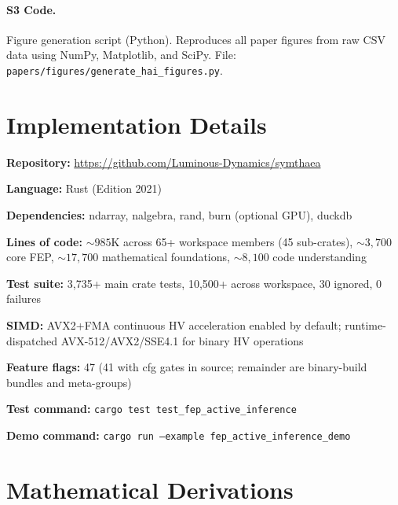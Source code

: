 \documentclass[10pt,letterpaper]{article}
\begin{document}
\paragraph*{S3 Code.}
\label{s3-code}
{Figure generation script (Python). Reproduces all paper figures from raw CSV
data using NumPy, Matplotlib, and SciPy. File:
\texttt{papers/figures/generate\_hai\_figures.py}.}




\appendix

\section{Implementation Details}
\label{app:implementation}

{\raggedright
\textbf{Repository:} \url{https://github.com/Luminous-Dynamics/symthaea}\par
\textbf{Language:} Rust (Edition 2021)\par
\textbf{Dependencies:} ndarray, nalgebra, rand, burn (optional GPU), duckdb\par
\textbf{Lines of code:} ${\sim}985$K across 65+ workspace members (45 sub-crates), ${\sim}3{,}700$ core FEP, ${\sim}17{,}700$ mathematical foundations, ${\sim}8{,}100$ code understanding\par
\textbf{Test suite:} 3,735+ main crate tests, 10,500+ across workspace, 30 ignored, 0 failures\par
\textbf{SIMD:} AVX2+FMA continuous HV acceleration enabled by default; runtime-dispatched AVX-512/AVX2/SSE4.1 for binary HV operations\par
\textbf{Feature flags:} 47 (41 with cfg gates in source; remainder are binary-build bundles and meta-groups)\par
\textbf{Test command:} \texttt{cargo test test\_fep\_active\_inference}\par
\textbf{Demo command:} \texttt{cargo run --example fep\_active\_inference\_demo}\par
}

\section{Mathematical Derivations}
\label{app:derivations}
\end{document}
